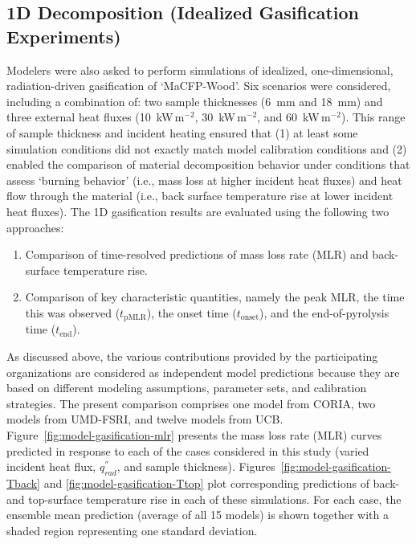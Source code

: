 \documentclass{article}
\begin{document}
\subsection{1D Decomposition (Idealized Gasification Experiments)}
Modelers were also asked to perform simulations of idealized, one-dimensional, radiation-driven gasification of `MaCFP-Wood'. Six scenarios were considered, including a combination of: two sample thicknesses (6~mm and 18~mm) and three external heat fluxes (10~kW\,m$^{-2}$, 30~kW\,m$^{-2}$, and 60~kW\,m$^{-2}$). This range of sample thickness and incident heating ensured that (1) at least some simulation conditions did not exactly match model calibration conditions and (2) enabled the comparison of material decomposition behavior under conditions that assess `burning behavior' (i.e., mass loss at higher incident heat fluxes) and heat flow through the material (i.e., back surface temperature rise at lower incident heat fluxes). The 1D gasification results are evaluated using the following two approaches: 
\begin{enumerate} 
\item Comparison of time-resolved predictions of mass loss rate (MLR) and back-surface temperature rise. 
\item Comparison of key characteristic quantities, namely the peak MLR, the time this was observed ($t_{\mathrm{pMLR}}$), the onset time ($t_{\mathrm{onset}}$), and the end-of-pyrolysis time ($t_{\mathrm{end}}$). \end{enumerate} 

As discussed above, the various contributions provided by the participating organizations are considered as independent model predictions because they are based on different modeling assumptions, parameter sets, and calibration strategies. The present comparison comprises one model from CORIA, two models from UMD-FSRI, and twelve models from UCB.\\

Figure~\ref{fig:model-gasification-mlr} presents the mass loss rate (MLR) curves predicted in response to each of the cases considered in this study (varied incident heat flux, $q^{''}_{rad}$, and sample thickness). Figures~\ref{fig:model-gasification-Tback} and \ref{fig:model-gasification-Ttop} plot corresponding predictions of back- and top-surface temperature rise in each of these simulations. For each case, the ensemble mean prediction (average of all 15 models) is shown together with a shaded region representing one standard deviation. 
\end{document}

